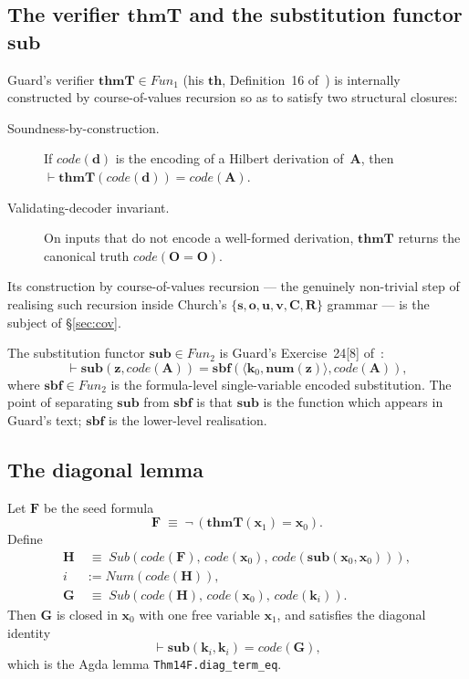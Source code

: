 \documentclass[11pt]{article}
\theoremstyle{plain}
\theoremstyle{definition}
\theoremstyle{remark}
\newcommand{\code}[1]{\mathit{code}(#1)}
\newcommand{\sub}{\mathbf{sub}}
\newcommand{\sbf}{\mathbf{sbf}}
\newcommand{\thmT}{\mathbf{thmT}}
\newcommand{\num}{\mathbf{num}}
\newcommand{\seq}[1]{\langle #1 \rangle}
\newcommand{\Fun}{\mathit{Fun}}
\newcommand{\Sub}{\mathit{Sub}}
\newcommand{\Num}{\mathit{Num}}
\begin{document}
\subsection{The verifier $\thmT$ and the substitution functor $\sub$}

Guard's verifier $\thmT \in \Fun_1$ (his $\mathbf{th}$, Definition~16
of~\cite{Guard63}) is internally constructed by course-of-values
recursion so as to satisfy two structural closures:
\begin{description}
\item[Soundness-by-construction.] If $\code{\mathbf{d}}$ is the
encoding of a Hilbert derivation of~$\mathbf{A}$, then
$\vdash \thmT(\code{\mathbf{d}}) = \code{\mathbf{A}}$.

\item[Validating-decoder invariant.] On inputs that do not
encode a well-formed derivation, $\thmT$ returns the canonical truth
$\code{\mathbf{O} = \mathbf{O}}$.
\end{description}
Its construction by course-of-values recursion --- the genuinely
non-trivial step of realising such recursion inside Church's
$\{\mathbf{s},\mathbf{o},\mathbf{u},\mathbf{v},\mathbf{C},\mathbf{R}\}$
grammar --- is the subject of {\S}\ref{sec:cov}.

The substitution functor $\sub \in \Fun_2$ is Guard's Exercise~24[8]
of~\cite{Guard63}:
\[
\vdash \sub(\mathbf{z}, \code{\mathbf{A}}) = \sbf(\seq{\mathbf{k}_0, \num(\mathbf{z})}, \code{\mathbf{A}}),
\]
where $\sbf \in \Fun_2$ is the formula-level single-variable encoded
substitution.  The point of separating $\sub$ from $\sbf$ is that
$\sub$ is the function which appears in Guard's text; $\sbf$ is the
lower-level realisation.

\subsection{The diagonal lemma}

Let $\mathbf{F}$ be the seed formula
\[
\mathbf{F} \;\equiv\; \neg\,(\thmT(\mathbf{x}_1) = \mathbf{x}_0).
\]
Define
\begin{align*}
\mathbf{H} &\;\equiv\; \Sub(\code{\mathbf{F}},\, \code{\mathbf{x}_0},\, \code{\sub(\mathbf{x}_0, \mathbf{x}_0)}), \\
i &:= \Num(\code{\mathbf{H}}), \\
\mathbf{G} &\;\equiv\; \Sub(\code{\mathbf{H}},\, \code{\mathbf{x}_0},\, \code{\mathbf{k}_i}).
\end{align*}
Then $\mathbf{G}$ is closed in $\mathbf{x}_0$ with one free variable
$\mathbf{x}_1$, and satisfies the diagonal identity
\[
\vdash \sub(\mathbf{k}_i, \mathbf{k}_i) = \code{\mathbf{G}},
\]
which is the Agda lemma \texttt{Thm14F.diag\_term\_eq}.
\end{document}
